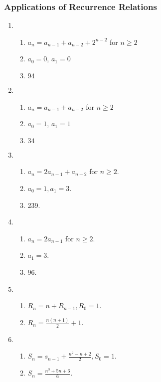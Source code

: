\documentclass{../../cls/sig-alternate-05-2015}
\begin{document}
\subsubsection{Applications of Recurrence Relations}
\begin{enumerate}
\item \begin{enumerate}
    \item $a_n = a_{n-1} + a_{n-2} + 2^{n-2}$ for $n \geq 2$
    \item $a_0 = 0$, $a_1 = 0$
    \item $94$
\end{enumerate}

\item \begin{enumerate}
    \item $a_n = a_{n-1} + a_{n-2}$ for $n \geq 2$
    \item $a_0 = 1$, $a_1 = 1$
    \item $34$
\end{enumerate}

\item \begin{enumerate}
    \item $a_n  = 2 a_{n - 1} + a_{n - 2}$ for $n \ge 2$.
    \item $a_0 = 1, a_1 = 3$.
    \item 239.
\end{enumerate}

\item \begin{enumerate}
    \item $a_n  = 2 a_{n - 1}$ for $n \ge 2$.
    \item $a_1 = 3$.
    \item 96.
\end{enumerate}

\item \begin{enumerate}
    \item $R_n = n + R_{n - 1}, R_0 = 1$.
    \item $R_n = \frac{n(n + 1)}{2} + 1$.
\end{enumerate}

\item \begin{enumerate}
    \item $S_n = s_{n - 1} + \frac{n^2 - n + 2}{2}, S_0 = 1$.
    \item $S_n = \frac{n^3 + 5n + 6}{6}$.
\end{enumerate}


\end{enumerate}
\end{document}
